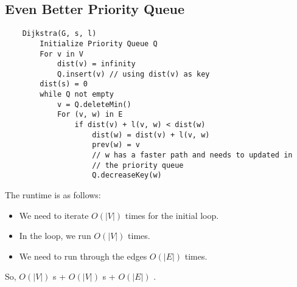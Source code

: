 \documentclass[letterpaper]{article}
\begin{document}
\subsection{Even Better Priority Queue}
\begin{verbatim}
    Dijkstra(G, s, l)
        Initialize Priority Queue Q 
        For v in V
            dist(v) = infinity
            Q.insert(v) // using dist(v) as key
        dist(s) = 0
        while Q not empty
            v = Q.deleteMin()
            For (v, w) in E
                if dist(v) + l(v, w) < dist(w)
                    dist(w) = dist(v) + l(v, w)
                    prev(w) = v
                    // w has a faster path and needs to updated in
                    // the priority queue 
                    Q.decreaseKey(w)
\end{verbatim}
The runtime is as follows: 
\begin{itemize}
    \item We need to iterate $O(|V|)$ times for the initial loop. 
    \item In the  loop, we run $O(|V|)$ times. 
    \item We need to run through the edges $O(|E|)$ times. 
\end{itemize}
So, $O(|V|)$ s + $O(|V|)$ s + $O(|E|)$ .
\end{document}
